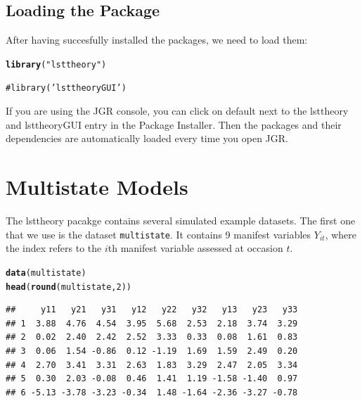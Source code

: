 \documentclass[10pt]{article}\usepackage{graphicx, color}
\makeatletter
\newcommand{\hlfunctioncall}[1]{\textcolor[rgb]{0.501960784313725,0,0.329411764705882}{\textbf{#1}}}%
\newcommand{\hlstring}[1]{\textcolor[rgb]{0.6,0.6,1}{#1}}%
\newcommand{\hlcomment}[1]{\textcolor[rgb]{0.180392156862745,0.6,0.341176470588235}{#1}}%
\newenvironment{kframe}{%
 \def\at@end@of@kframe{}%
 \ifinner\ifhmode%
  \def\at@end@of@kframe{\end{minipage}}%
  \begin{minipage}{\columnwidth}%
 \fi\fi%
 \def\FrameCommand##1{\hskip\@totalleftmargin \hskip-\fboxsep
 \colorbox{shadecolor}{##1}\hskip-\fboxsep
     \hskip-\linewidth \hskip-\@totalleftmargin \hskip\columnwidth}%
 \MakeFramed {\advance\hsize-\width
   \@totalleftmargin\z@ \linewidth\hsize
   \@setminipage}}%
 {\par\unskip\endMakeFramed%
 \at@end@of@kframe}
\newenvironment{knitrout}{}{} %
\makeatother
\begin{document}
%

\subsection{Loading the Package}

After having succesfully installed the packages, we need to load them:
%
\begin{knitrout}
\color{fgcolor}\begin{kframe}
\begin{alltt}
\hlfunctioncall{library}(\hlstring{"lsttheory"})
\end{alltt}


{\ttfamily\noindent\itshape\color{messagecolor}{\#\# Loading required package: lavaan}}

{\ttfamily\noindent\itshape\color{messagecolor}{\#\# This is lavaan 0.5-16}}

{\ttfamily\noindent\itshape\color{messagecolor}{\#\# lavaan is BETA software! Please report any bugs.}}\begin{alltt}
\hlcomment{# library('lsttheoryGUI')}
\end{alltt}
\end{kframe}
\end{knitrout}

%
If you are using the JGR console, you can click on default next to the lsttheory and lsttheoryGUI entry in the Package Installer. Then the packages and their dependencies are automatically loaded every time you open JGR.

\newpage
\section{Multistate Models}

The lsttheory pacakge contains several simulated example datasets. The first one that we use is the dataset \texttt{multistate}. It contains 9 manifest variables $Y_{it}$, where the index refers to the $i$th manifest variable assessed at occasion $t$.
%
\begin{knitrout}
\color{fgcolor}\begin{kframe}
\begin{alltt}
\hlfunctioncall{data}(multistate)
\hlfunctioncall{head}(\hlfunctioncall{round}(multistate, 2))
\end{alltt}
\begin{verbatim}
##     y11   y21   y31   y12   y22   y32   y13   y23   y33
## 1  3.88  4.76  4.54  3.95  5.68  2.53  2.18  3.74  3.29
## 2  0.02  2.40  2.42  2.52  3.33  0.33  0.08  1.61  0.83
## 3  0.06  1.54 -0.86  0.12 -1.19  1.69  1.59  2.49  0.20
## 4  2.70  3.41  3.31  2.63  1.83  3.29  2.47  2.05  3.34
## 5  0.30  2.03 -0.08  0.46  1.41  1.19 -1.58 -1.40  0.97
## 6 -5.13 -3.78 -3.23 -0.34  1.48 -1.64 -2.36 -3.27 -0.78
\end{verbatim}
\end{kframe}
\end{knitrout}
\end{document}
